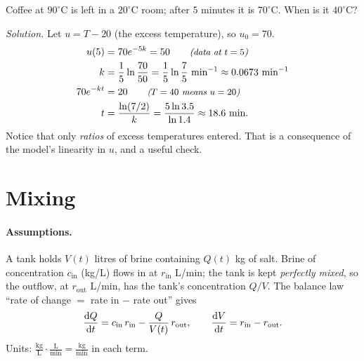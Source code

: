 \begin{example}[Coffee]\label{ex:ch02-coffee}
Coffee at $90^\circ$C is left in a $20^\circ$C room; after $5$ minutes it is
$70^\circ$C. When is it $40^\circ$C?

\emph{Solution.} Let $u = T - 20$ (the excess temperature), so $u_0 = 70$.
\begin{align*}
  u(5) &= 70e^{-5k} = 50 \why{data at $t=5$}\\
  k &= \frac15\ln\frac{70}{50} = \frac15\ln\frac75\ \text{min}^{-1}
       \approx 0.0673\ \text{min}^{-1}\\
  70e^{-kt} &= 20 \why{$T = 40$ means $u = 20$}\\
  t &= \frac{\ln(7/2)}{k} = \frac{5\ln 3.5}{\ln 1.4}\approx 18.6\ \text{min}.
\end{align*}
Notice that only \emph{ratios} of excess temperatures entered. That is a
consequence of the model's linearity in $u$, and a useful check.
\end{example}

\section{Mixing}\label{sec:ch02-mixing}

\paragraph{Assumptions.} A tank holds $V(t)$ litres of brine containing $Q(t)$
kg of salt. Brine of concentration $c_{\mathrm{in}}$ (kg/L) flows in at
$r_{\mathrm{in}}$ L/min; the tank is kept \emph{perfectly mixed}, so the
outflow, at $r_{\mathrm{out}}$ L/min, has the tank's concentration $Q/V$. The
balance law ``rate of change $=$ rate in $-$ rate out'' gives
\begin{equation}\label{eq:ch02-mixing}
  \frac{\mathrm{d}Q}{\mathrm{d}t} = c_{\mathrm{in}}\,r_{\mathrm{in}} - \frac{Q}{V(t)}\,r_{\mathrm{out}},
  \qquad
  \frac{\mathrm{d}V}{\mathrm{d}t} = r_{\mathrm{in}} - r_{\mathrm{out}} .
\end{equation}
Units: $\frac{\text{kg}}{\text{L}}\cdot\frac{\text{L}}{\text{min}}
= \frac{\text{kg}}{\text{min}}$ in each term. \checkmark

